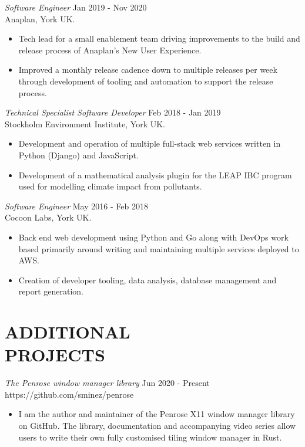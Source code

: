 \documentclass[margin]{res}
\begin{document}
\begin{resume}
{\sl Software Engineer} \hfill Jan 2019 - Nov 2020 \\
Anaplan, York UK.
\begin{itemize}  \itemsep -2pt %
  \item Tech lead for a small enablement team driving improvements to
        the build and release process of Anaplan's New User Experience.
  \item Improved a monthly release cadence down to multiple releases per
        week through development of tooling and automation to support the
        release process.
\end{itemize}

{\sl Technical Specialist Software Developer} \hfill Feb 2018 - Jan 2019 \\
Stockholm Environment Institute, York UK.
\begin{itemize}  \itemsep -2pt %
  \item Development and operation of multiple full-stack web services written
        in Python (Django) and JavaScript.
  \item Development of a mathematical analysis plugin for the LEAP IBC program
        used for modelling climate impact from pollutants.
\end{itemize}

{\sl Software Engineer} \hfill May 2016 - Feb 2018 \\
Cocoon Labs, York UK.
\begin{itemize}  \itemsep -2pt %
  \item Back end web development using Python and Go along with DevOps work based
        primarily around writing and maintaining multiple services deployed to AWS.
  \item Creation of developer tooling, data analysis, database management and
        report generation.
\end{itemize}



\section{ADDITIONAL \\ PROJECTS}             
{\sl The Penrose window manager library} \hfill Jun 2020 - Present \\
https://github.com/sminez/penrose
\begin{itemize}  \itemsep -2pt %
  \item I am the author and maintainer of the Penrose X11 window
        manager library on GitHub. The library, documentation and accompanying
        video series allow users to write their own fully customised tiling
        window manager in Rust.
\end{itemize}


\end{resume}
\end{document}
